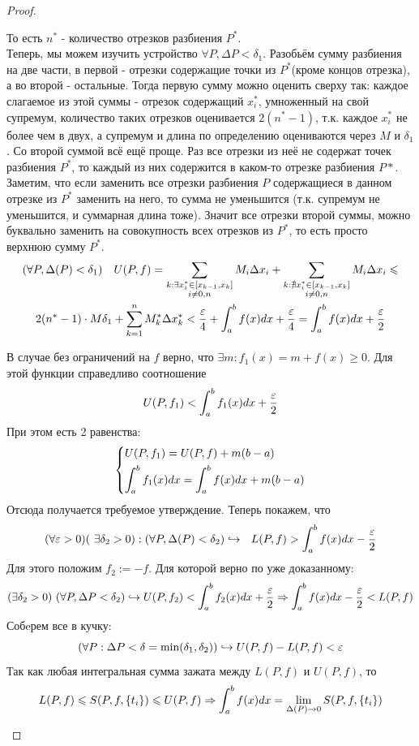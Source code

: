 \begin{proof}
\begin{itemize}
		То есть $n^*$ - количество отрезков разбиения $P^*$. \\
		Теперь, мы можем изучить устройство $\forall P, \Delta P < \delta_1$. Разобьём сумму разбиения на две части, в первой - отрезки содержащие точки из $P^*$(кроме концов отрезка), а во второй - остальные. Тогда первую сумму можно оценить сверху так: каждое слагаемое из этой суммы - отрезок содержащий $x_i^*$, умноженный на свой супремум, количество таких отрезков оценивается $2(n^*-1)$, т.к. каждое $x_i^*$ не более чем в двух, а супремум и длина по определению оцениваются через $M$ и $\delta_1$. Со второй суммой всё ещё проще. Раз все отрезки из неё не содержат точек разбиения $P^*$, то каждый из них содержится в каком-то отрезке разбиения $P*$. Заметим, что если заменить все отрезки разбиения $P$ содержащиеся в данном отрезке из $P^*$ заменить на него, то сумма не уменьшится (т.к. супремум не уменьшится, и суммарная длина тоже). Значит все отрезки второй суммы, можно буквально заменить на совокупность всех отрезков из $P^*$, то есть просто верхнюю сумму $P^*$. 
		\begin{multline*}
			(\forall P, \Delta (P) < \delta_1) \quad U(P, f) = \sum\limits_{\substack{k: \exists  x_i^*\in[x_{k-1}, x_k] \\ i \neq0,n}} M_i\Delta x_i + \sum\limits_{\substack{k: \nexists  x_i^*\in[x_{k-1}, x_k] \\ i \neq0,n}} M_i\Delta x_i \leqslant
			\\
			2(n^* - 1) \cdot M\delta_1 + \sum\limits_{k = 1}^n M_k^*\Delta x_k^* < \frac{\varepsilon}{4} + \int_a^bf(x)dx + \frac{\varepsilon}{4} = \int_a^bf(x)dx + \frac{\varepsilon}{2}
		\end{multline*} 
	
	В случае без ограничений на $f$ верно, что $\exists m : f_1(x) = m + f(x) \geq 0$. Для этой функции справедливо соотношение
	\[
		U(P, f_1) < \int_a^bf_1(x)dx + \frac{\varepsilon}{2}
	\]
	При этом есть 2 равенства:
	\[
		\left\{\begin{aligned}
			&{U(P, f_1) = U(P, f) + m(b - a)}
			\\
			&{\int_a^b f_1(x)dx = \int_a^b f(x)dx + m(b - a)}
		\end{aligned}\right.
	\]
	Отсюда получается требуемое утверждение. Теперь покажем, что
		\[
			(\forall \eps > 0)(\ \exists \delta_2 > 0) : (\forall P, \Delta(P) < \delta_2)\hookrightarrow\ \ L(P, f) >  \int_a^b f(x)dx - \frac{\eps}{2}
		\]
		Для этого положим $f_2 := -f$. Для которой верно по уже доказанному:
		\[
			(\exists \delta_2 > 0)\ (\forall P, \Delta P < \delta_2)\hookrightarrow U(P, f_2) < \int_a^bf_2(x)dx + \frac{\varepsilon}{2} \Rightarrow \int_a^bf(x)dx - \frac{\varepsilon}{2} < L(P, f)
		\]
		Собeрем все в кучку:
		\[
			(\forall P : \Delta P < \delta = \min(\delta_1, \delta_2))\hookrightarrow U(P, f) - L(P, f) < \varepsilon
		\]
		Так как любая интегральная сумма зажата между $L(P, f)$ и $U(P, f)$, то
		\[
			L(P, f) \leqslant  S(P, f, \{t_i\}) \leqslant U(P, f) \Rightarrow \int_a^bf(x)dx = \lim\limits_{\Delta(P) \to 0}S(P, f, \{t_i\})
		\]
	\end{itemize}
\end{proof}

